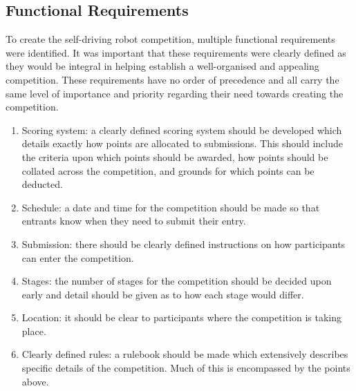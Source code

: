\documentclass{l4proj}
\begin{document}
\subsection{Functional Requirements}
To create the self-driving robot competition, multiple functional requirements were identified. It was important that these requirements were clearly defined as they would be integral in helping establish a well-organised and appealing competition. These requirements have no order of precedence and all carry the same level of importance and priority regarding their need towards creating the competition.
\begin{enumerate}[label=A\arabic*]
    \item Scoring system: a clearly defined scoring system should be developed which details exactly how points are allocated to submissions. This should include the criteria upon which points should be awarded, how points should be collated across the competition, and grounds for which points can be deducted.
    \item Schedule: a date and time for the competition should be made so that entrants know when they need to submit their entry.
    \item Submission: there should be clearly defined instructions on how participants can enter the competition.
    \item Stages: the number of stages for the competition should be decided upon early and detail should be given as to how each stage would differ.
    \item Location: it should be clear to participants where the competition is taking place.
    \item Clearly defined rules: a rulebook should be made which extensively describes specific details of the competition. Much of this is encompassed by the points above.
\end{enumerate}
\end{document}
